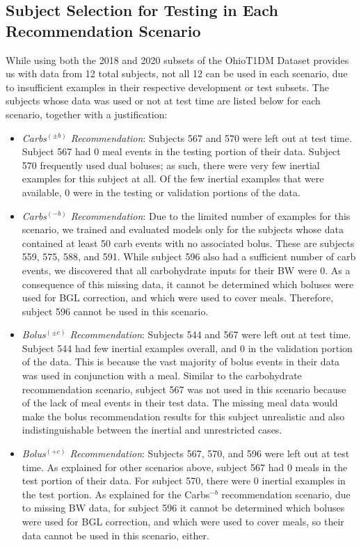 \documentclass[journal,article,submit,moreauthors,pdftex]{Definitions/mdpi}
\begin{document}
\subsection{Subject Selection for Testing in Each Recommendation Scenario}
\label{sec:selection}

While using both the 2018 and 2020 subsets of the OhioT1DM Dataset \cite{ohiot1dm:marling:kdh18, ohiot1dm:marling:kdh20} provides us with data from 12 total subjects, not all 12 can be used in each scenario, due to insufficient examples in their respective development or test subsets. The subjects whose data was used or not at test time are listed below for each scenario, together with a justification:
\begin{itemize}
    \item {\it Carbs$^{(\pm b)}$ Recommendation}: Subjects 567 and 570 were left out at test time. Subject 567 had 0 meal events in the testing portion of their data. Subject 570 frequently used dual boluses; as such, there were very few inertial examples for this subject at all. Of the few inertial examples that were available, 0 were in the testing or validation portions of the data.
    \item {\it Carbs$^{(-b)}$ Recommendation}: Due to the limited number of examples for this scenario, we trained and evaluated models only for the subjects whose data contained at least 50 carb events with no associated bolus. These are subjects 559, 575, 588, and 591. While subject 596 also had a sufficient number of carb events, we discovered that all carbohydrate inputs for their BW were 0. As a consequence of this missing data, it cannot be determined which boluses were used for BGL correction, and which were used to cover meals. Therefore, subject 596 cannot be used in this scenario.
    \item {\it Bolus$^{(\pm c)}$ Recommendation}: Subjects 544 and 567 were left out at test time. Subject 544  had few inertial examples overall, and 0 in the validation portion of the data. This is because the vast majority of bolus events in their data was used in conjunction with a meal. Similar to the carbohydrate recommendation scenario, subject 567 was not used in this scenario because of the lack of meal events in their test data. The missing meal data would make the bolus recommendation results for this subject unrealistic and also indistinguishable between the inertial and unrestricted cases.
    \item {\it Bolus$^{(+c)}$ Recommendation}: Subjects 567, 570, and 596 were left out at test time. As explained for other scenarios above, subject 567 had 0 meals in the test portion of their data. For subject 570, there were 0 inertial examples in the test portion. As explained for the Carbs$^{-b}$ recommendation scenario, due to missing BW data, for subject 596 it cannot be determined which boluses were used for BGL correction, and which were used to cover meals, so their data cannot be used in this scenario, either.
\end{itemize}
\end{document}
